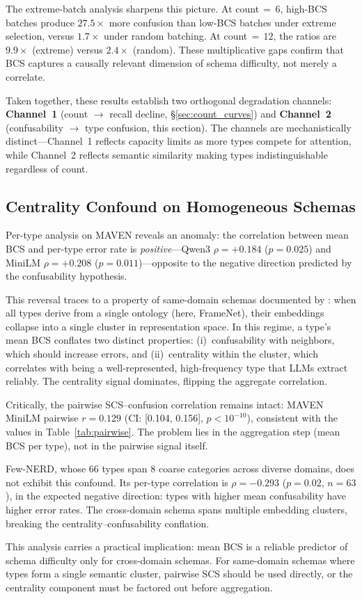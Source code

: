 The extreme-batch analysis sharpens this picture. At count${}\,=\,6$, high-BCS batches produce $27.5\times$ more confusion than low-BCS batches under extreme selection, versus $1.7\times$ under random batching. At count${}\,=\,12$, the ratios are $9.9\times$ (extreme) versus $2.4\times$ (random). These multiplicative gaps confirm that BCS captures a causally relevant dimension of schema difficulty, not merely a correlate.

Taken together, these results establish two orthogonal degradation channels: \textbf{Channel~1} (count $\to$ recall decline, \S\ref{sec:count_curves}) and \textbf{Channel~2} (confusability $\to$ type confusion, this section). The channels are mechanistically distinct---Channel~1 reflects capacity limits as more types compete for attention, while Channel~2 reflects semantic similarity making types indistinguishable regardless of count.

\subsection{Centrality Confound on Homogeneous Schemas}
\label{sec:centrality_confound}

Per-type analysis on MAVEN reveals an anomaly: the correlation between mean BCS and per-type error rate is \emph{positive}---Qwen3 $\rho = +0.184$ ($p = 0.025$) and MiniLM $\rho = +0.208$ ($p = 0.011$)---opposite to the negative direction predicted by the confusability hypothesis.

This reversal traces to a property of same-domain schemas documented by \citet{cai-isotropy-clusters-2021}: when all types derive from a single ontology (here, FrameNet), their embeddings collapse into a single cluster in representation space. In this regime, a type's mean BCS conflates two distinct properties: (i)~confusability with neighbors, which should increase errors, and (ii)~centrality within the cluster, which correlates with being a well-represented, high-frequency type that LLMs extract reliably. The centrality signal dominates, flipping the aggregate correlation.

Critically, the pairwise SCS--confusion correlation remains intact: MAVEN MiniLM pairwise $r = 0.129$ (CI: [0.104, 0.156], $p < 10^{-10}$), consistent with the values in Table~\ref{tab:pairwise}. The problem lies in the aggregation step (mean BCS per type), not in the pairwise signal itself.

Few-NERD, whose 66 types span 8 coarse categories across diverse domains, does not exhibit this confound. Its per-type correlation is $\rho = -0.293$ ($p = 0.02$, $n = 63$), in the expected negative direction: types with higher mean confusability have higher error rates. The cross-domain schema spans multiple embedding clusters, breaking the centrality--confusability conflation.

This analysis carries a practical implication: mean BCS is a reliable predictor of schema difficulty only for cross-domain schemas. For same-domain schemas where types form a single semantic cluster, pairwise SCS should be used directly, or the centrality component must be factored out before aggregation.
